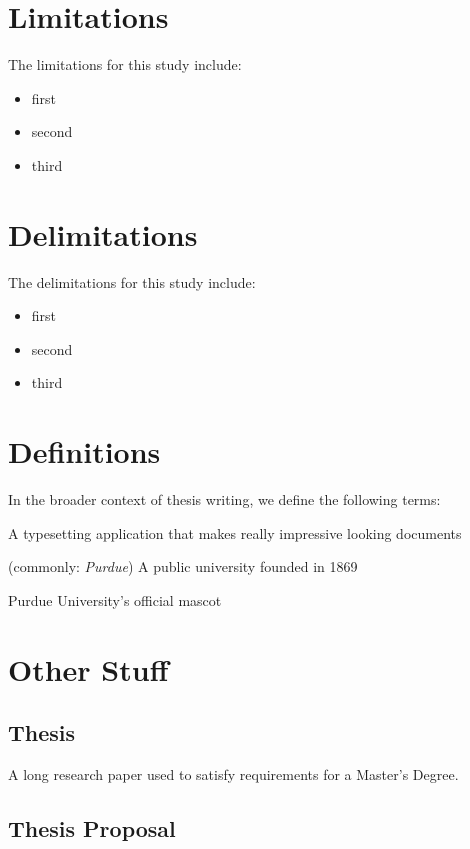 \section{Limitations}

The limitations for this study include:
\begin{itemize}
\item first
\item second
\item third
\end{itemize}


\section{Delimitations}

The delimitations for this study include:
\begin{itemize}
\item first
\item second
\item third
\end{itemize}


\section{Definitions}
In the broader context of thesis writing, we define the following terms:
\begin{italicdesc}
\item[\LaTeX:] A typesetting application that makes really impressive looking documents
\item[Purdue University:] (commonly: \textit{Purdue}) A public university founded in 1869
\item[Boilermakers:] Purdue University's official mascot
\end{italicdesc}


\section{Other Stuff}

\subsection{Thesis}

A long research paper used to satisfy requirements for a Master's Degree.


\subsection{Thesis Proposal}

